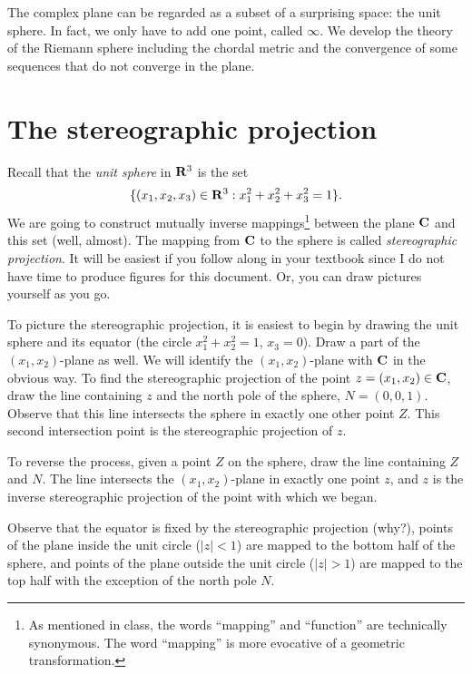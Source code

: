 \documentclass[twocolumn,12pt]{article}
\date{February 22, 2013 (Fri)}
\begin{document}
\makeheader

\begin{summary}
The complex plane can be regarded as a subset of a surprising space: the unit sphere. In fact, we only have to add one point, called $\infty$. We develop the theory of the Riemann sphere including the chordal metric and the convergence of some sequences that do not converge in the plane.
\end{summary}

\section{The stereographic projection}
Recall that the \emph{unit sphere} in $\mathbf{R}^3$ is the set
\[
    \{ (x_1, x_2, x_3) \in \mathbf{R}^3 : x_1^2 + x_2^2 + x_3^2 = 1 \}.
\]
We are going to construct mutually inverse mappings\footnote{As mentioned in class, the words ``mapping'' and ``function'' are technically synonymous. The word ``mapping'' is more evocative of a geometric transformation.} between the plane $\mathbf{C}$ and this set (well, almost). The mapping from $\mathbf{C}$ to the sphere is called \emph{stereographic projection}. It will be easiest if you follow along in your textbook since I do not have time to produce figures for this document. Or, you can draw pictures yourself as you go.

To picture the stereographic projection, it is easiest to begin by drawing the unit sphere and its equator (the circle $x_1^2 + x_2^2 = 1$, $x_3 = 0$). Draw a part of the $(x_1,x_2)$-plane as well. We will identify the $(x_1,x_2)$-plane with $\mathbf{C}$ in the obvious way. To find the stereographic projection of the point $z = (x_1, x_2) \in \mathbf{C}$, draw the line containing $z$ and the north pole of the sphere, $N = (0,0,1)$. Observe that this line intersects the sphere in exactly one other point $Z$. This second intersection point is the stereographic projection of $z$.

To reverse the process, given a point $Z$ on the sphere, draw the line containing $Z$ and $N$. The line intersects the $(x_1, x_2)$-plane in exactly one point $z$, and $z$ is the inverse stereographic projection of the point with which we began.

Observe that the equator is fixed by the stereographic projection (why?), points of the plane inside the unit circle ($|z| < 1$) are mapped to the bottom half of the sphere, and points of the plane outside the unit circle ($|z| > 1$) are mapped to the top half with the exception of the north pole $N$. 
\end{document}

